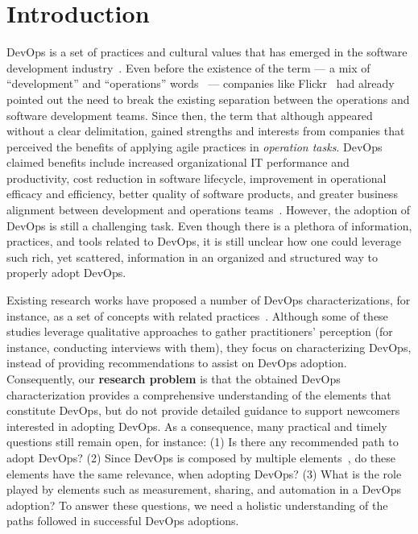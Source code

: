 \section{Introduction} \label{sec:introduction}

DevOps is a set of practices and cultural values that has emerged in the
software development industry~\cite{devops_a_definition_xp_15,dimensions_of_devops_xp_15,extending_dimensions_icsea_16,characterizing_devops_sbes_2016}. Even before
the existence of the term --- a mix of ``development'' and ``operations''
words~\cite{httermann2012devops} --- companies like Flickr~\cite{flickr}
had already pointed out the need to break the existing separation between
the operations and software development teams. Since then, the term
that although appeared without a clear delimitation, gained strengths and interests
from companies that perceived the benefits of applying agile practices in
\emph{operation tasks}.
DevOps claimed benefits include increased organizational IT
performance and productivity, cost reduction in software lifecycle, improvement
in operational efficacy and efficiency, better quality of software products, and
greater business alignment between development and operations
teams~\cite{characterizing_devops_sbes_2016,state_of_devops,DevOps_Adoption_Benefits_and_Challenges}.
However, the adoption of DevOps is still a challenging task. Even though there is a
plethora of information, practices, and tools related to DevOps, it is still unclear
how one could leverage such rich, yet scattered, information in an organized and
structured way to properly adopt DevOps.

Existing research works have proposed a
number of DevOps characterizations, for instance, as a set of concepts with
related
practices~\cite{devops_a_definition_xp_15,dimensions_of_devops_xp_15,extending_dimensions_icsea_16,characterizing_devops_sbes_2016,cooperation_dev_ops_esem_2014,qualitative_devops_journalsw_17}. Although some
of these studies leverage qualitative approaches to gather practitioners' perception (for instance,
conducting interviews with them), they focus on characterizing DevOps,
instead of providing recommendations to assist on DevOps adoption. Consequently,
our {\bf research problem} is that the obtained DevOps characterization provides a
comprehensive understanding of the elements that constitute DevOps, but do not
provide detailed guidance to support newcomers interested in adopting DevOps.
As a consequence, many practical and timely questions still remain open, for
instance: (1) Is there any recommended path to adopt DevOps? (2) Since
DevOps is composed by multiple elements~\cite{dimensions_of_devops_xp_15}, do
these elements have the same relevance, when adopting DevOps?
(3) What is the role played by elements such as measurement, sharing, and automation
in a DevOps adoption? To answer these questions, we need a holistic
understanding of the paths followed in successful DevOps adoptions.


